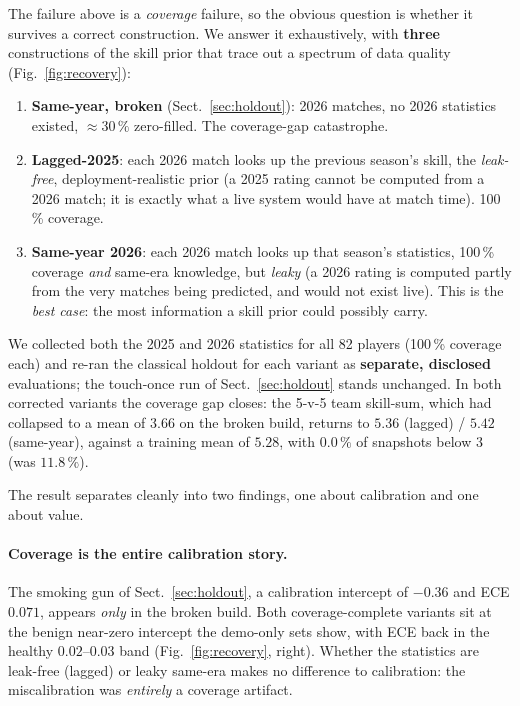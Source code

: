 \documentclass[11pt,a4paper]{article}
\begin{document}
The failure above is a \emph{coverage} failure, so the obvious question is whether it survives a
correct construction. We answer it exhaustively, with \textbf{three} constructions of the skill prior
that trace out a spectrum of data quality (Fig.~\ref{fig:recovery}):

\begin{enumerate}
  \item \textbf{Same-year, broken} (Sect.~\ref{sec:holdout}): 2026 matches, no 2026 statistics existed,
    $\approx 30\,\%$ zero-filled. The coverage-gap catastrophe.
  \item \textbf{Lagged-2025}: each 2026 match looks up the previous season's skill, the
    \emph{leak-free}, deployment-realistic prior (a 2025 rating cannot be computed from a 2026 match; it
    is exactly what a live system would have at match time). 100\,\% coverage.
  \item \textbf{Same-year 2026}: each 2026 match looks up that season's statistics, 100\,\% coverage
    \emph{and} same-era knowledge, but \emph{leaky} (a 2026 rating is computed partly from the very
    matches being predicted, and would not exist live). This is the \emph{best case}: the most
    information a skill prior could possibly carry.
\end{enumerate}

We collected both the 2025 and 2026 statistics for all 82 players (100\,\% coverage each) and re-ran
the classical holdout for each variant as \textbf{separate, disclosed} evaluations; the touch-once run
of Sect.~\ref{sec:holdout} stands unchanged. In both corrected variants the coverage gap closes: the
5-v-5 team skill-sum, which had collapsed to a mean of $3.66$ on the broken build, returns to $5.36$
(lagged) / $5.42$ (same-year), against a training mean of $5.28$, with $0.0\,\%$ of snapshots below
$3$ (was $11.8\,\%$).

The result separates cleanly into two findings, one about calibration and one about value.

\paragraph{Coverage is the entire calibration story.}
The smoking gun of Sect.~\ref{sec:holdout}, a calibration intercept of $-0.36$ and ECE $0.071$, appears \emph{only} in the broken build. Both coverage-complete variants sit at the benign near-zero
intercept the demo-only sets show, with ECE back in the healthy $0.02$--$0.03$ band
(Fig.~\ref{fig:recovery}, right). Whether the statistics are leak-free (lagged) or leaky same-era makes
no difference to calibration: the miscalibration was \emph{entirely} a coverage artifact.
\end{document}
